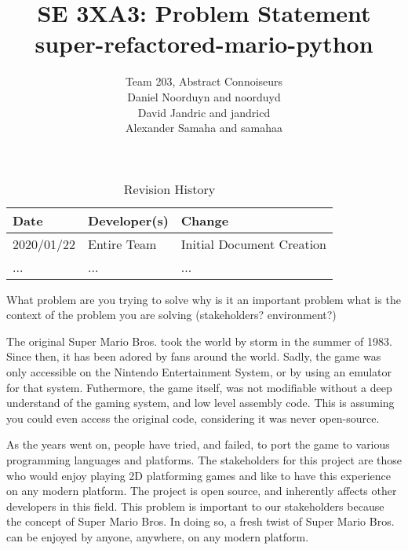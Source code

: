 \documentclass{article}
\title{SE 3XA3: Problem Statement\\super-refactored-mario-python}
\author{Team 203, Abstract Connoiseurs
		\\ Daniel Noorduyn and noorduyd
		\\ David Jandric and jandricd
		\\ Alexander Samaha and samahaa
}
\date{}
\begin{document}
\begin{table}[hp]
\caption{Revision History} \label{TblRevisionHistory}
\begin{tabularx}{\textwidth}{llX}
\toprule
\textbf{Date} & \textbf{Developer(s)} & \textbf{Change}\\
\midrule
2020/01/22 & Entire Team & Initial Document Creation\\
... & ... & ...\\
\bottomrule
\end{tabularx}
\end{table}

\newpage

\maketitle

What problem are you trying to solve
why is it an important problem
what is the context of the problem you are solving (stakeholders? environment?)

The original Super Mario Bros. took the world by storm in the summer of 1983. Since then, it has been adored by fans around the world. Sadly, the game was only accessible on the Nintendo Entertainment System, or by using an emulator for that system. Futhermore, the game itself, was not modifiable without a deep understand of the gaming system, and low level assembly code. This is assuming you could even access the original code, considering it was never open-source.

As the years went on, people have tried, and failed, to port the game to various programming languages and platforms. The stakeholders for this project are those who would enjoy playing 2D platforming games and like to have this experience on any modern platform. The project is open source, and inherently affects other developers in this field. This problem is important to our stakeholders because the concept of Super Mario Bros.  
In doing so, a fresh twist of Super Mario Bros. can be enjoyed by anyone, anywhere, on any modern platform.





\end{document}
